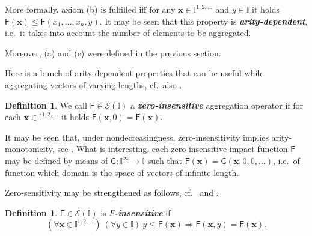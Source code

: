 \documentclass[11pt]{article}\usepackage[]{graphicx}\usepackage[]{color}
\renewcommand{\emph}[1]{\textbf{\textsl{#1}}}
\newcommand{\vect}[1]{{\mathbf{#1}}}
\newcommand{\func}[1]{{\mathsf{#1}}}
\newcommand{\Ival}{\mathbb{I}}
\newcommand{\IvalPow}[1]{\mathbb{I}^{#1}}
\newcommand{\AnyPow}{^{1,2,\dots}}
\newcommand{\IvalAnyPow}{\mathbb{I}\AnyPow}
\theoremstyle{remark}
\theoremstyle{definition}
\newtheorem{definition}[theorem]{Definition}
\begin{document}
More formally, axiom (b) is fulfilled iff
for any $\vect{x}\in\IvalAnyPow$ and $y\in\Ival$ it holds
$\func{F}(\vect{x})\le\func{F}(x_1,\dots,x_n,y)$.
It may be seen that this property is \emph{arity-dependent},
i.e.~it takes into account the number of elements to be aggregated.

Moreover, (a) and (c) were defined in the previous section.

\bigskip
Here is a bunch of arity-dependent properties
that can  be useful while aggregating vectors
of varying lengths, cf.~also \cite{CenaGagolewski2014:om3fss}.


\begin{definition}\label{Def:zero_insensitive}
We call $\func{F}\in \mathcal{E}(\Ival)$ a
\emph{zero-insensitive} aggregation operator if
for each $\vect{x}\in\IvalAnyPow$ it holds
\(
\func{F}(\vect{x},0)=\func{F}(\vect{x}).
\)
\end{definition}


It may be seen that, under nondecreasingness,
zero-insensitivity implies arity-monotonicity,
see \cite{GagolewskiGrzegorzewski2010:ipmu}.
What is interesting, each zero-insensitive impact function $\func{F}$
may be defined by means of $\func{G}:\IvalPow{\infty}\to\Ival$
such that $\func{F}(\vect{x}) = \func{G}(\vect{x},0,0,\dots)$,
i.e.~of function which domain is the space of vectors of infinite length.

Zero-sensitivity may be strengthened as follows,
cf.~\cite{GagolewskiGrzegorzewski2010:ipmu}
and \cite[Axiom A1]{Woeginger2008:axiomatich}.


\begin{definition}\label{Def:Wlasnosc_F-}
$\func{F}\in \mathcal{E}(\Ival)$ is \emph{$F$-insensitive} if
\begin{equation*}
(\forall \vect{x}\in\IvalAnyPow)\ (\forall y\in\Ival)\ y\le\func{F}(\vect{x})
\Longrightarrow \func{F}(\vect{x},y)=\func{F}(\vect{x}).
\end{equation*}
\end{definition}
\end{document}
